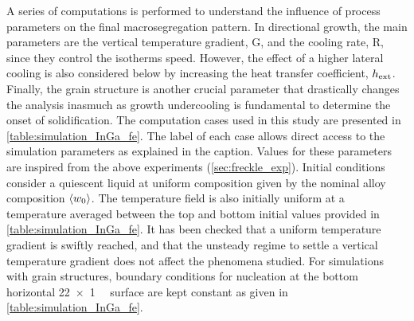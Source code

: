 A series of computations is performed to understand the influence of process parameters on the final macrosegregation pattern. 
In directional growth, the main parameters are the vertical temperature gradient, G, and the cooling rate, R, since they control the isotherms 
speed. However, the effect of a higher lateral cooling is also considered below by increasing the heat transfer coefficient,
$h_{\text{ext}}$. Finally, the grain structure is another crucial parameter that drastically changes the analysis inasmuch as growth 
undercooling is fundamental to determine the onset of solidification. The computation cases used in this study are presented 
in \cref{table:simulation_InGa_fe}. The label of each case allows direct access to the simulation parameters as explained in the caption. Values for 
these parameters are inspired from the above experiments (\cref{sec:freckle_exp}). Initial conditions consider a quiescent 
liquid at uniform composition given by the nominal alloy composition $\langle {w}_0 \rangle$. The temperature field is also initially uniform 
at a temperature averaged between the top and bottom initial values provided in \cref{table:simulation_InGa_fe}. It has been checked that a uniform 
temperature gradient is swiftly reached, and that the unsteady regime to settle a vertical temperature gradient does not affect 
the phenomena studied. For simulations with grain structures, boundary conditions for nucleation at the bottom horizontal \SI{22 x 1}{\milli \uarea} 
surface are kept constant as given in \cref{table:simulation_InGa_fe}.

